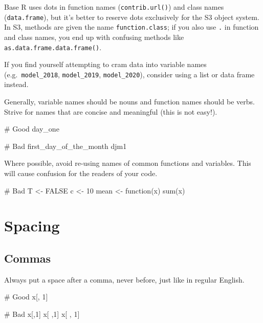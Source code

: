 \documentclass[twoside, pagesize, fontsize=11pt, dvipsnames]{scrreport} %
\newenvironment{Shaded}{\begin{snugshade}}{\end{snugshade}}
\newcommand{\CommentTok}[1]{\textcolor[rgb]{0.37,0.37,0.37}{#1}}
\newcommand{\ConstantTok}[1]{\textcolor[rgb]{0.56,0.35,0.01}{#1}}
\newcommand{\ControlFlowTok}[1]{\textcolor[rgb]{0.00,0.23,0.31}{#1}}
\newcommand{\DecValTok}[1]{\textcolor[rgb]{0.68,0.00,0.00}{#1}}
\newcommand{\FunctionTok}[1]{\textcolor[rgb]{0.28,0.35,0.67}{#1}}
\newcommand{\NormalTok}[1]{\textcolor[rgb]{0.00,0.23,0.31}{#1}}
\newcommand{\OtherTok}[1]{\textcolor[rgb]{0.00,0.23,0.31}{#1}}
\begin{document}
Base R uses dots in function names (\texttt{contrib.url()}) and class
names (\texttt{data.frame}), but it's better to reserve dots exclusively
for the S3 object system. In S3, methods are given the name
\texttt{function.class}; if you also use \texttt{.} in function and
class names, you end up with confusing methods like
\texttt{as.data.frame.data.frame()}.

If you find yourself attempting to cram data into variable names
(e.g.~\texttt{model\_2018}, \texttt{model\_2019}, \texttt{model\_2020}),
consider using a list or data frame instead.

Generally, variable names should be nouns and function names should be
verbs. Strive for names that are concise and meaningful (this is not
easy!).

\begin{Shaded}
\begin{Highlighting}[]
\CommentTok{\# Good}
\NormalTok{day\_one}

\CommentTok{\# Bad}
\NormalTok{first\_day\_of\_the\_month}
\NormalTok{djm1}
\end{Highlighting}
\end{Shaded}

Where possible, avoid re-using names of common functions and variables.
This will cause confusion for the readers of your code.

\begin{Shaded}
\begin{Highlighting}[]
\CommentTok{\# Bad}
\NormalTok{T }\OtherTok{\textless{}{-}} \ConstantTok{FALSE}
\NormalTok{c }\OtherTok{\textless{}{-}} \DecValTok{10}
\NormalTok{mean }\OtherTok{\textless{}{-}} \ControlFlowTok{function}\NormalTok{(x) }\FunctionTok{sum}\NormalTok{(x)}
\end{Highlighting}
\end{Shaded}

\hypertarget{spacing}{%
\section{Spacing}\label{spacing}}

\hypertarget{commas}{%
\subsection{Commas}\label{commas}}

Always put a space after a comma, never before, just like in regular
English.

\begin{Shaded}
\begin{Highlighting}[]
\CommentTok{\# Good}
\NormalTok{x[, }\DecValTok{1}\NormalTok{]}

\CommentTok{\# Bad}
\NormalTok{x[,}\DecValTok{1}\NormalTok{]}
\NormalTok{x[ ,}\DecValTok{1}\NormalTok{]}
\NormalTok{x[ , }\DecValTok{1}\NormalTok{]}
\end{Highlighting}
\end{Shaded}
\end{document}
